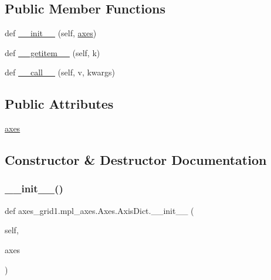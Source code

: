 \subsection*{Public Member Functions}
\begin{DoxyCompactItemize}
\item 
def \hyperlink{classaxes__grid1_1_1mpl__axes_1_1Axes_1_1AxisDict_a8fb28fe6cfd38c92c3bdb9bdec93d6b6}{\+\_\+\+\_\+init\+\_\+\+\_\+} (self, \hyperlink{classaxes__grid1_1_1mpl__axes_1_1Axes_1_1AxisDict_a5d41ba97269050669864f4c67e35d66e}{axes})
\item 
def \hyperlink{classaxes__grid1_1_1mpl__axes_1_1Axes_1_1AxisDict_acf858540754c612a060b81a613e6a7f9}{\+\_\+\+\_\+getitem\+\_\+\+\_\+} (self, k)
\item 
def \hyperlink{classaxes__grid1_1_1mpl__axes_1_1Axes_1_1AxisDict_a55974a7193571ea815b12c0eb87d2308}{\+\_\+\+\_\+call\+\_\+\+\_\+} (self, v, kwargs)
\end{DoxyCompactItemize}
\subsection*{Public Attributes}
\begin{DoxyCompactItemize}
\item 
\hyperlink{classaxes__grid1_1_1mpl__axes_1_1Axes_1_1AxisDict_a5d41ba97269050669864f4c67e35d66e}{axes}
\end{DoxyCompactItemize}


\subsection{Constructor \& Destructor Documentation}
\mbox{\label{classaxes__grid1_1_1mpl__axes_1_1Axes_1_1AxisDict_a8fb28fe6cfd38c92c3bdb9bdec93d6b6}} 
\subsubsection{\texorpdfstring{\+\_\+\+\_\+init\+\_\+\+\_\+()}{\_\_init\_\_()}}
{\footnotesize\ttfamily def axes\+\_\+grid1.\+mpl\+\_\+axes.\+Axes.\+Axis\+Dict.\+\_\+\+\_\+init\+\_\+\+\_\+ (\begin{DoxyParamCaption}\item[{}]{self,  }\item[{}]{axes }\end{DoxyParamCaption})}



